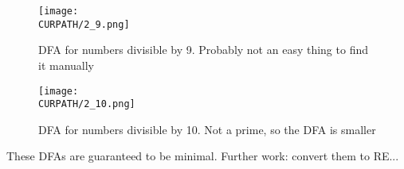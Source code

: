 \begin{figure}[H]
\centering
\texttt{[image: \\CURPATH/2\_9.png]}
\caption{DFA for numbers divisible by 9. Probably not an easy thing to find it manually}
\end{figure}

\begin{figure}[H]
\centering
\texttt{[image: \\CURPATH/2\_10.png]}
\caption{DFA for numbers divisible by 10. Not a prime, so the DFA is smaller}
\end{figure}

These DFAs are guaranteed to be minimal.
Further work: convert them to \ac{RE}...

